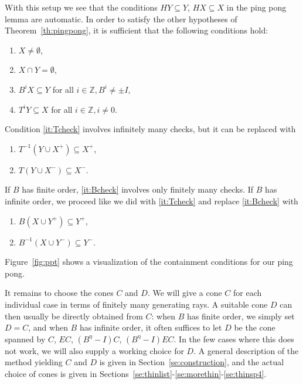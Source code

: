 \documentclass[11pt,a4paper]{amsart}
\theoremstyle{definition}
\theoremstyle{definition}
\numberwithin{equation}{section}
\begin{document}
With this setup we see that the conditions $H Y \subseteq Y$, $H X \subseteq X$ in the ping pong lemma are automatic. In order to satisfy the other hypotheses of Theorem~\ref{th:pingpong}, it is sufficient that the following conditions hold:
\begin{enumerate}
\item\label{it:nonempty} $X\neq\emptyset$,
\item\label{it:disjoint} $X\cap Y=\emptyset$,
\item\label{it:Bcheck} $B^{i}X\subseteq Y$ for all $i\in\mathbb{Z}, B^i\neq\pm I$,
\item\label{it:Tcheck} $T^i Y\subseteq X$ for all $i\in\mathbb{Z},i\neq 0$.
\end{enumerate}
Condition \eqref{it:Tcheck} involves infinitely many checks, but it can be replaced with
\begin{enumerate}
\renewcommand{\theenumi}{4\alph{enumi}}
\renewcommand{\labelenumi}{(\theenumi)}
\item\label{it:Tcheck_plus} $T^{-1}(Y\cup X^{+})\subseteq X^{+}$,
\item\label{it:Tcheck_minus} $T(Y\cup X^{-})\subseteq X^{-}$.
\end{enumerate}
If $B$ has finite order, \eqref{it:Bcheck} involves only finitely many checks. If $B$ has infinite order, we proceed like we did with \eqref{it:Tcheck} and replace \eqref{it:Bcheck} with

\begin{enumerate}
\renewcommand{\theenumi}{3\alph{enumi}}
\renewcommand{\labelenumi}{(\theenumi)}
\item\label{it:Bcheck_plus} $B(X\cup Y^{+})\subseteq Y^{+}$,
\item\label{it:Bcheck_minus} $B^{-1}(X\cup Y^{-})\subseteq Y^{-}$.
\end{enumerate}

Figure~\ref{fig:ppt} shows a visualization of the containment conditions for our ping pong.

It remains to choose the cones $C$ and $D$. We will give a cone $C$ for each individual case in terms of finitely many generating rays. A suitable cone $D$ can then usually be directly obtained from $C$: when $B$ has finite order, we simply set $D=C$, and when $B$ has infinite order, it often suffices to let $D$ be the cone spanned by $C$, $EC$, $(B^\eta-I)C$, $(B^\eta-I)EC$. In the few cases where this does not work, we will also supply a working choice for $D$. A general description of the method yielding $C$ and $D$ is given in Section~\ref{se:construction}, and the actual choice of cones is given in Sections~\ref{se:thinlist}-\ref{se:morethin}-\ref{se:thinsp4}.
\end{document}
